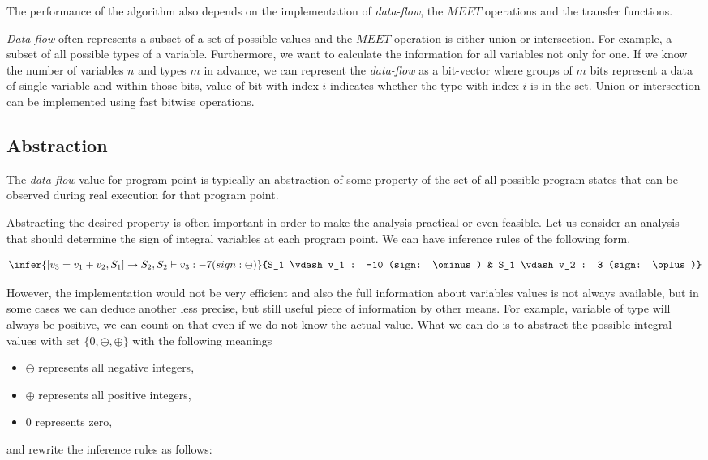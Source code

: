         The performance of the algorithm also depends on the implementation 
        of \emph{data-flow}, the $\textit{MEET}$ operations and the transfer 
        functions. 
        
        \emph{Data-flow} often represents a subset of a set of possible values 
        and the $\textit{MEET}$ operation is either union or intersection.
        For example, a subset of all possible types of a variable. 
        Furthermore, we want to calculate the information for all 
        variables not only for one. If we know the number of variables $n$ and 
        types $m$ in advance, we can represent the \emph{data-flow} as 
        a bit-vector where groups of $m$ bits represent a data of 
        single variable and within those bits, value of bit with 
        index $i$ indicates whether the type with index $i$ is in the set. 
        Union or intersection can be implemented using fast bitwise operations.


        \subsection{Abstraction}
        
        The \emph{data-flow} value for program point is typically an abstraction 
        of some property of the set of all possible program states that can be 
        observed during real execution for that program point. 
        
        Abstracting the desired property is often important in order to make 
        the analysis practical or even feasible. Let us consider an analysis 
        that should determine the sign of integral variables at each program point.
        We can have inference rules of the following form.
        
        $$
        \infer{[v_3=v_1+v_2, S_1] \rightarrow S_2, S_2 \vdash v_3 : -7 (sign: \ominus)}
        {S_1 \vdash v_1 : -10 (sign: \ominus) & S_1 \vdash v_2 : 3 (sign: \oplus)}
        $$
        
        However, the implementation would not be very efficient and also the full 
        information about variables values is not always available, but in some cases 
        we can deduce another less precise, but still useful piece of information 
        by other means. For example, variable of type  will 
        always be positive, we can count on that even if we do not know the actual value. 
        What we can do is to abstract the possible integral values with set 
        $\{0, \ominus, \oplus\}$ with the following meanings         
        \begin{itemize}
            \item $\ominus$ represents all negative integers,
            \item $\oplus$ represents all positive integers,
            \item $0$ represents zero,
        \end{itemize}                
        and rewrite the inference rules as follows:
        
